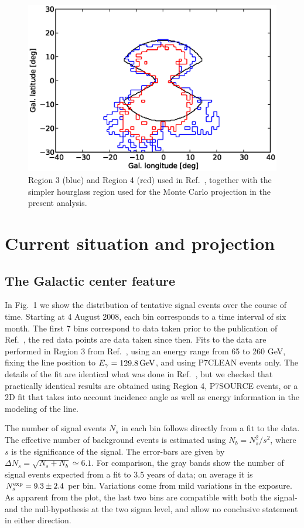 \documentclass[aps,prd,superscriptaddress,showpacs,nofootinbib,fixlfloat, 12pt]{revtex4-1}
\begin{document}
\begin{figure}[h]
  \begin{center}
    \includegraphics[width=0.6\linewidth]{plots/regions.eps}
    \vspace{-0.5cm}
  \end{center}
  \caption{Region 3 (blue) and Region 4 (red) used in
    Ref.~\cite{Weniger:2012}, together with the simpler hourglass region used
    for the Monte Carlo projection in the present analysis.}
  \label{fig:projection}
\end{figure}


\section{Current situation and projection}
\subsection{The Galactic center feature}
In Fig.~1 we show the distribution of tentative signal events over the course
of time.  Starting at 4 August 2008, each bin corresponds to a time interval
of six month. The first 7 bins correspond to data taken prior to the
publication of Ref.~\cite{Bringmann:2012}, the red data points are data taken
since then.  Fits to the data are performed in Region 3 from
Ref.~\cite{Weniger:2012}, using an energy range from 65 to 260 GeV, fixing the
line position to $E_\gamma=129.8\rm\,GeV$, and using P7CLEAN events only. The
details of the fit are identical what was done in Ref.~\cite{Weniger:2012},
but we checked that practically identical results are obtained using Region 4,
P7SOURCE events, or a 2D fit that takes into account incidence angle as well
as energy information in the modeling of the line. 

The number of signal events $N_s$ in each bin follows directly from a fit to
the data. The effective number of background events is estimated using $N_b =
N_s^2/s^2$, where $s$ is the significance of the signal. The error-bars are
given by $\Delta N_s = \sqrt{N_s+N_b}\simeq6.1$. For comparison, the gray
bands show the number of signal events expected from a fit to 3.5 years of
data; on average it is $N_s^{\rm exp}=9.3\pm2.4$ per bin.  Variations come
from mild variations in the exposure.  As apparent from the plot, the last two
bins are compatible with both the signal- and the null-hypothesis at the two
sigma level, and allow no conclusive statement in either direction.\medskip
\end{document}
